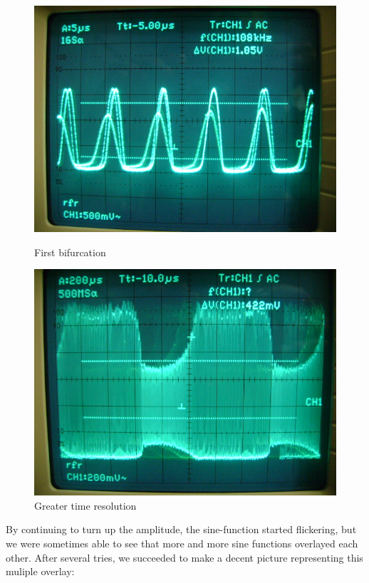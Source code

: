 \begin{figure}[H]
\begin{minipage}{0.5\textwidth}
\centering \includegraphics[width=\textwidth]{Fotos/01.jpg}
\caption{First bifurcation}
\end{minipage}
\begin{minipage}{0.5\textwidth}
\centering \includegraphics[width=\textwidth]{Fotos/02.jpg}
\caption{Greater time resolution}
\label{aaa}
\end{minipage}
\end{figure}

By continuing to turn up the amplitude, the sine-function started flickering, but we were sometimes able to see that more and more sine functions overlayed each other. After several tries, we succeeded to make a decent picture representing this muliple overlay:

